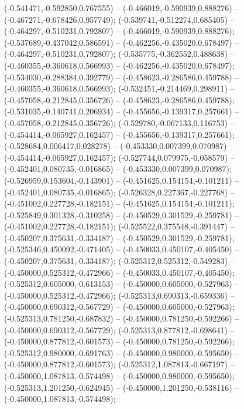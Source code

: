  (-0.541471,-0.592850,0.767555) -- (-0.466019,-0.590939,0.888276) -- (-0.467271,-0.678426,0.957749);
 (-0.539741,-0.512274,0.685405) -- (-0.464297,-0.510231,0.792807) -- (-0.466019,-0.590939,0.888276);
 (-0.537689,-0.437042,0.586591) -- (-0.462256,-0.435020,0.678497) -- (-0.464297,-0.510231,0.792807);
 (-0.535775,-0.362552,0.488638) -- (-0.460355,-0.360618,0.566993) -- (-0.462256,-0.435020,0.678497);
 (-0.534030,-0.288384,0.392779) -- (-0.458623,-0.286586,0.459788) -- (-0.460355,-0.360618,0.566993);
 (-0.532451,-0.214469,0.298911) -- (-0.457058,-0.212845,0.356726) -- (-0.458623,-0.286586,0.459788);
 (-0.531035,-0.140741,0.206934) -- (-0.455656,-0.139317,0.257661) -- (-0.457058,-0.212845,0.356726);
 (-0.529780,-0.067133,0.116753) -- (-0.454414,-0.065927,0.162457) -- (-0.455656,-0.139317,0.257661);
 (-0.528684,0.006417,0.028278) -- (-0.453330,0.007399,0.070987) -- (-0.454414,-0.065927,0.162457);
 (-0.527744,0.079975,-0.058579) -- (-0.452401,0.080735,-0.016865) -- (-0.453330,0.007399,0.070987);
 (-0.526959,0.153604,-0.143901) -- (-0.451625,0.154154,-0.101211) -- (-0.452401,0.080735,-0.016865);
 (-0.526328,0.227367,-0.227768) -- (-0.451002,0.227728,-0.182151) -- (-0.451625,0.154154,-0.101211);
 (-0.525849,0.301328,-0.310258) -- (-0.450529,0.301529,-0.259781) -- (-0.451002,0.227728,-0.182151);
 (-0.525522,0.375548,-0.391447) -- (-0.450207,0.375631,-0.334187) -- (-0.450529,0.301529,-0.259781);
 (-0.525346,0.450092,-0.471405) -- (-0.450033,0.450107,-0.405450) -- (-0.450207,0.375631,-0.334187);
 (-0.525312,0.525312,-0.549283) -- (-0.450000,0.525312,-0.472966) -- (-0.450033,0.450107,-0.405450);
 (-0.525312,0.605000,-0.613153) -- (-0.450000,0.605000,-0.527963) -- (-0.450000,0.525312,-0.472966);
 (-0.525313,0.690313,-0.659336) -- (-0.450000,0.690312,-0.567729) -- (-0.450000,0.605000,-0.527963);
 (-0.525313,0.781250,-0.687832) -- (-0.450000,0.781250,-0.592266) -- (-0.450000,0.690312,-0.567729);
 (-0.525313,0.877812,-0.698641) -- (-0.450000,0.877812,-0.601573) -- (-0.450000,0.781250,-0.592266);
 (-0.525312,0.980000,-0.691763) -- (-0.450000,0.980000,-0.595650) -- (-0.450000,0.877812,-0.601573);
 (-0.525312,1.087813,-0.667197) -- (-0.450000,1.087813,-0.574498) -- (-0.450000,0.980000,-0.595650);
 (-0.525313,1.201250,-0.624945) -- (-0.450000,1.201250,-0.538116) -- (-0.450000,1.087813,-0.574498);
